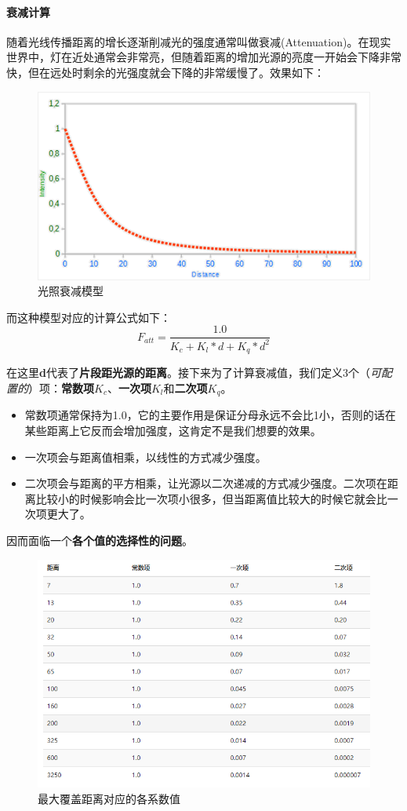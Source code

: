 \documentclass[UTF8,a4paper,12pt]{ctexbook}
\begin{document}
			
			\paragraph{衰减计算}
				随着光线传播距离的增长逐渐削减光的强度通常叫做衰减(Attenuation)。在现实世界中，灯在近处通常会非常亮，但随着距离的增加光源的亮度一开始会下降非常快，但在远处时剩余的光强度就会下降的非常缓慢了。效果如下：
				
				\begin{figure}[H]
					\centering
					\includegraphics[width=.79\linewidth]{attenuation}
					\caption{光照衰减模型}
				\end{figure}
				
				而这种模型对应的计算公式如下：
				$$ F_{att} = \dfrac{1.0}{K_c + K_l * d + K_q * d^2}$$
				
				在这里\textbf{d}代表了\textbf{片段距光源的距离}。接下来为了计算衰减值，我们定义3个（\textit{可配置的}）项：\textbf{常数项}$K_c$、\textbf{一次项}$K_l$和\textbf{二次项}$K_q$。
					
				\begin{itemize}
					\item 常数项通常保持为1.0，它的主要作用是保证分母永远不会比1小，否则的话在某些距离上它反而会增加强度，这肯定不是我们想要的效果。
					\item 一次项会与距离值相乘，以线性的方式减少强度。
					\item 二次项会与距离的平方相乘，让光源以二次递减的方式减少强度。二次项在距离比较小的时候影响会比一次项小很多，但当距离值比较大的时候它就会比一次项更大了。
				\end{itemize}
			
				因而面临一个\textbf{各个值的选择性的问题}。
				
				\begin{figure}[H]
					\centering
					\includegraphics[width=.85\linewidth]{attenuation2}
					\caption{最大覆盖距离对应的各系数值}
				\end{figure}
			
\end{document}
